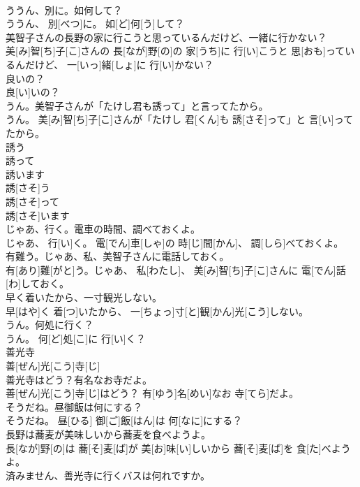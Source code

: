 \documentclass[8pt]{extreport}
\begin{document}
\begin{CJK}{UTF8}{min}
\\	ううん、別に。如何して？	
\\	ううん、 別[べつ]に。 如[ど]何[う]して？
\\	美智子さんの長野の家に行こうと思っているんだけど、一緒に行かない？	
\\	美[み]智[ち]子[こ]さんの 長[なが]野[の]の 家[うち]に 行[い]こうと 思[おも]っているんだけど、 一[いっ]緒[しょ]に 行[い]かない？
\\	良いの？	
\\	良[い]いの？
\\	うん。美智子さんが「たけし君も誘って」と言ってたから。	
\\	うん。 美[み]智[ち]子[こ]さんが「たけし 君[くん]も 誘[さそ]って」と 言[い]ってたから。
\\	誘う 
\\	誘って 
\\	誘います	
\\	誘[さそ]う 
\\	誘[さそ]って 
\\	誘[さそ]います
\\	じゃあ、行く。電車の時間、調べておくよ。	
\\	じゃあ、 行[い]く。 電[でん]車[しゃ]の 時[じ]間[かん]、 調[しら]べておくよ。
\\	有難う。じゃあ、私、美智子さんに電話しておく。	
\\	有[あり]難[がと]う。じゃあ、 私[わたし]、 美[み]智[ち]子[こ]さんに 電[でん]話[わ]しておく。
\\	早く着いたから、一寸観光しない。	
\\	早[はや]く 着[つ]いたから、 一[ちょっ]寸[と]観[かん]光[こう]しない。
\\	うん。何処に行く？	
\\	うん。 何[ど]処[こ]に 行[い]く？
\\	善光寺	
\\	善[ぜん]光[こう]寺[じ]	
\\	善光寺はどう？有名なお寺だよ。	
\\	善[ぜん]光[こう]寺[じ]はどう？ 有[ゆう]名[めい]なお 寺[てら]だよ。
\\	そうだね。昼御飯は何にする？	
\\	そうだね。 昼[ひる] 御[ご]飯[はん]は 何[なに]にする？
\\	長野は蕎麦が美味しいから蕎麦を食べようよ。	
\\	長[なが]野[の]は 蕎[そ]麦[ば]が 美[お]味[い]しいから 蕎[そ]麦[ば]を 食[た]べようよ。
\\	済みません、善光寺に行くバスは何れですか。	

\end{CJK}
\end{document}
